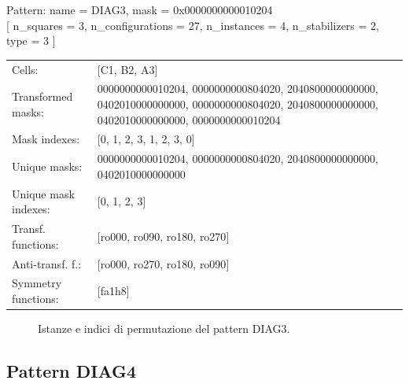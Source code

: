 \begin{tcolorbox}[sharp corners, fontupper=\ttfamily\small, colback=white]
  \noindent Pattern: name = DIAG3, mask = 0x0000000000010204\\
  {[} n\_squares = 3, n\_configurations = 27,
  n\_instances = 4, n\_stabilizers = 2, type = 3 { ]}\\[1.0ex]
  \begin{tabularx}{\textwidth}{@{} p{3.5cm} X @{}}
    Cells:               & {[}C1, B2, A3{]}\\[0.5ex]
    Transformed masks:   & 0000000000010204, 0000000000804020, 2040800000000000, 0402010000000000, 0000000000804020, 2040800000000000, 0402010000000000, 0000000000010204\\[0.5ex]
    Mask indexes:        & {[}0, 1, 2, 3, 1, 2, 3, 0{]}\\[0.5ex]
    Unique masks:        & 0000000000010204, 0000000000804020, 2040800000000000, 0402010000000000\\[0.5ex]
    Unique mask indexes: & {[}0, 1, 2, 3{]}\\[0.5ex]
    Transf. functions:   & {[}ro000, ro090, ro180, ro270{]}\\[0.5ex]
    Anti-transf. f.:     & {[}ro000, ro270, ro180, ro090{]}\\[0.5ex]
    Symmetry functions:  & {[}fa1h8{]}\\[0.5ex]
  \end{tabularx}
\end{tcolorbox}

\begin{figure}[htbp]
  \centering
   \hfill
   \hfill
   \hfill
  \vspace{0.3cm}
   \hfill
   \hfill
   \hfill
  \caption{Istanze e indici di permutazione del pattern DIAG3.}
\end{figure}

\newpage

\subsection{Pattern DIAG4}

